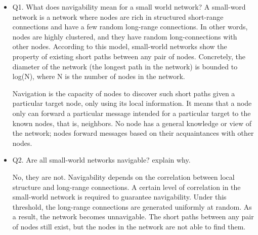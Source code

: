 \documentclass[10pt]{proc}
\begin{document}
\begin{itemize}
 \item Q1.  What does navigability mean for a small world network?
A small-word network is a network where nodes are rich in structured short-range connections and have a few random long-range connections. 
In other words, nodes are highly clustered, and they have random long-connections with other nodes. 
According to this model, small-world networks show the property of existing short paths between any pair of nodes. 
Concretely, the diameter of the network (the longest path in the network) is bounded to log(N), where N is the number of nodes in the network. 

Navigation is the capacity of nodes to discover such short paths given a particular target node, only using its local information. 
It means that a node only can forward a particular message intended for a particular target to the known nodes, that is, neighbors. 
No node has a general knowledge or view of the network; nodes forward messages based on their acquaintances with other nodes.

 \item Q2. Are all small-world networks navigable? explain why.

No, they are not. 
Navigability depends on the correlation between local structure and long-range connections. 
A certain level of correlation in the small-world network is required to guarantee navigability. 
Under this threshold, the long-range connections are generated uniformly at random. 
As a result, the network becomes unnavigable. 
The short paths between any pair of nodes still exist, but the nodes in the network are not able to find them. 
\end{itemize}



\end{document}
